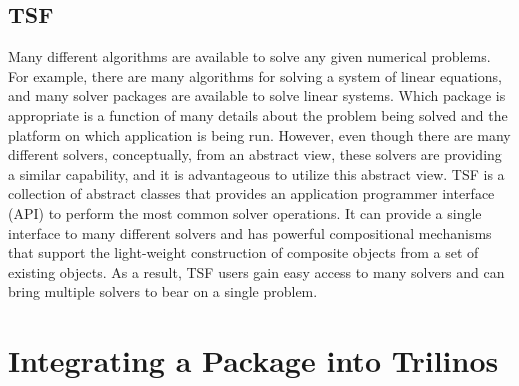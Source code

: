 \documentclass[12pt,relax]{TrilinosDevGuide}
\begin{document}
\subsection{TSF}
\label{subsect:InteropTSF}
Many different algorithms are available to solve any given numerical
problems.  For example, there are many algorithms for solving a system
of linear equations, and many solver packages are available to solve
linear systems.  Which package is appropriate is a function of
many details about the problem being solved and the platform on which
application is being run. However, even though
there are many different solvers, conceptually, from an abstract view,
these solvers are providing a similar capability, and it is
advantageous to utilize this abstract view.
TSF is a collection of abstract classes that provides an application
programmer interface (API) to perform the most common solver
operations.  It can provide a single interface to many different
solvers and has powerful compositional mechanisms that support the
light-weight construction of composite objects from a set of
existing objects.  As a result, TSF users gain easy access to many
solvers and can bring multiple solvers to bear on a single problem.

\section{Integrating a Package into Trilinos}
\label{Section:IntegratingPackages}
	
\end{document}
